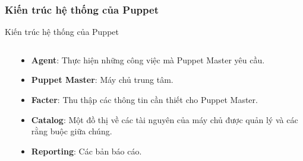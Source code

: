 \documentclass[14pt]{beamer}
\begin{document}
\subsubsection*{Kiến trúc hệ thống của Puppet}
\begin{frame}{Kiến trúc hệ thống của Puppet}
  \setlength{\topsep}{0pt}
  \begin{columns}
    \begin{column}{0.75\textwidth}
      \begin{center}
      \end{center}
    \end{column}
    \hfill
    \pause
    \begin{column}{0.38\textwidth}
      \begin{scriptsize}
        \begin{itemize}
          \item \textbf{Agent}: Thực hiện những công việc mà Puppet Master yêu cầu.
          \pause
          \item \textbf{Puppet Master}: Máy chủ trung tâm.
          \pause
          \item \textbf{Facter}: Thu thập các thông tin cần thiết cho Puppet Master.
          \pause
          \item \textbf{Catalog}: Một đồ thị về các tài nguyên của máy chủ được quản lý và các rằng buộc giữa chúng.
          \pause
          \item \textbf{Reporting}: Các bản báo cáo.
        \end{itemize}
      \end{scriptsize}
    \end{column}
  \end{columns}
\end{frame}
\end{document}
